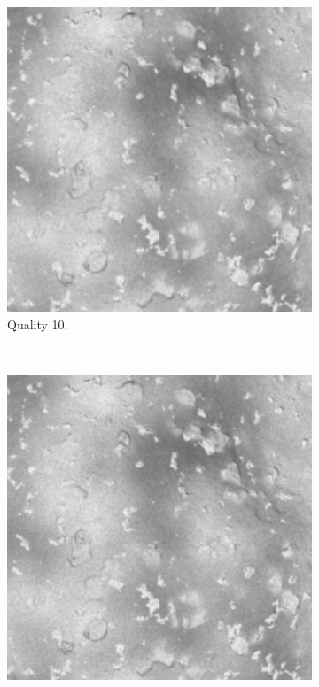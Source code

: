 \begin{figure}[htb]
\begin{center}
\begin{subfigure}[b]{0.47\textwidth}
\begin{center}
                \includegraphics[width=\textwidth]{doc/thesis/0_figures/quality_compare/jp2_10_center.png}
            \end{center}
            \caption{Quality 10.}
            \label{fig:img_quality_10}
        \end{subfigure}
        \\
        \begin{subfigure}[b]{0.47\textwidth}
            \begin{center}
                \includegraphics[width=\textwidth]{doc/thesis/0_figures/quality_compare/jp2_100_center.png}

\end{center}
\end{subfigure}
\end{center}
\end{figure}
